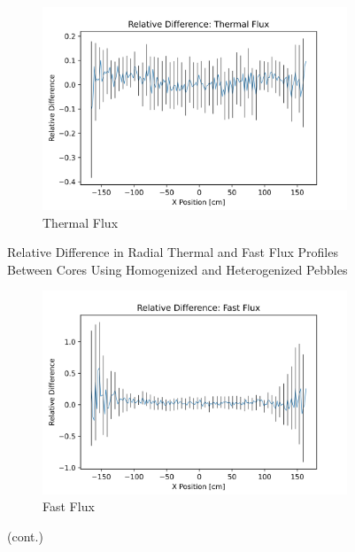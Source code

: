 \begin{figure}[H]
\centering

\begin{subfigure}{0.9\textwidth}
  \includegraphics[width=0.9\linewidth]{figures/reldiff_therm_flux.png}
  \caption{Thermal Flux}
  \label{fig:diff-therm}
\end{subfigure}%

\caption{Relative Difference in Radial Thermal and Fast Flux Profiles Between Cores Using Homogenized and Heterogenized Pebbles}
\end{figure}

\begin{figure}[H]\ContinuedFloat
\centering

\begin{subfigure}{0.9\textwidth}
  \includegraphics[width=0.9\linewidth]{figures/reldiff_fast_flux.png}
  \caption{Fast Flux}
  \label{fig:diff-fast}
\end{subfigure}

%
\caption[]{(cont.)}
\label{fig:diff-flux}
\end{figure}